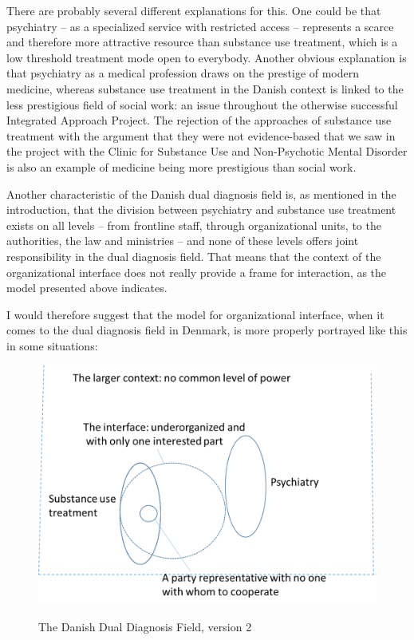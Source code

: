 \begin{multicols}{2}
There are probably several different explanations for this. One could be that psychiatry – as a specialized service with restricted access – represents a scarce and therefore more attractive resource than substance use treatment, which is a low threshold treatment mode open to everybody. Another obvious explanation is that psychiatry as a medical profession draws on the prestige of modern medicine, whereas substance use treatment in the Danish context is linked to the less prestigious field of social work: an issue throughout the otherwise successful Integrated Approach Project. The rejection of the approaches of substance use treatment with the argument that they were not evidence-based that we saw in the project with the Clinic for Substance Use and Non-Psychotic Mental Disorder is also an example of medicine being more prestigious than social work.
\par
Another characteristic of the Danish dual diagnosis field is, as mentioned in the introduction, that the division between psychiatry and substance use treatment exists on all levels – from frontline staff, through organizational units, to the authorities, the law and ministries – and none of these levels offers joint responsibility in the dual diagnosis field. That means that the context of the organizational interface does not really provide a frame for interaction, as the model presented above indicates.
\par
I would therefore suggest that the model for organizational interface, when it comes to the dual diagnosis field in Denmark, is more properly portrayed like this in some situations:
    \end{multicols}
    \FloatBarrier
    \noindent
    \begin{figure}[htb]
    \centering
    \caption{The Danish Dual Diagnosis Field, version 2}
    \includegraphics[width=0.9\linewidth]{paper6/p6_data/p6_model2.png}
    \label{fig:model:2}
    \end{figure}
